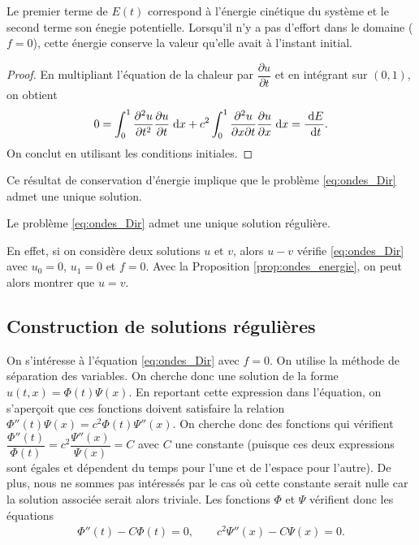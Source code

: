\documentclass[12pt,a4paper,twoside]{article}
\begin{document}
Le premier terme de $E(t)$ correspond \`a l'\'energie
cin\'etique du syst\`eme et le second terme son \'enegie potentielle.
Lorsqu'il n'y a pas d'effort dans le domaine ($f=0$),
cette \'energie conserve la valeur qu'elle avait \`a l'instant initial.

\begin{proof}
  En multipliant l'\'equation de la chaleur par $\dfrac{\partial u}{\partial t}$
  et en int\'egrant sur $(0,1)$, on obtient
  \begin{align*}
    0 = 
    \int_0^1 \dfrac{\partial^2 u}{\partial t^2} \dfrac{\partial u}{\partial t} \;\mathrm{d} x
    + c^2 
    \int_0^1 \dfrac{\partial^2 u}{\partial x \partial t} \dfrac{\partial u}{\partial x} \;\mathrm{d} x
    = \dfrac{\;\mathrm{d} E}{\;\mathrm{d} t} .
  \end{align*}
  On conclut en utilisant les conditions initiales.
\end{proof}

Ce r\'esultat de conservation d'\'energie implique que le probl\`eme 
\eqref{eq:ondes_Dir} admet une unique solution.
\begin{corrolary}
  Le probl\`eme \eqref{eq:ondes_Dir} admet une unique solution r\'eguli\`ere.
\end{corrolary}
En effet, si on consid\`ere deux solutions $u$ et $v$,
alors $u-v$ v\'erifie \eqref{eq:ondes_Dir} avec $u_0 = 0$, $u_1 = 0$ et $f=0$. 
Avec la Proposition \ref{prop:ondes_energie}, on peut alors
montrer que $u=v$.

\subsection{Construction de solutions r\'eguli\`eres}

On s'int\'eresse \`a l'\'equation \eqref{eq:ondes_Dir} avec $f = 0$.
On utilise la m\'ethode de s\'eparation des variables.
On cherche donc une solution de la forme $u(t,x) = \Phi(t) \Psi(x)$.
En reportant cette expression dans l'\'equation, on s'aper\c{c}oit 
que ces fonctions doivent satisfaire la relation
$\Phi''(t) \Psi(x) = c^2 \Phi(t) \Psi''(x)$.
On cherche donc des fonctions qui v\'erifient
$\dfrac{\Phi''(t)}{\Phi(t)} = c^2 \dfrac{\Psi''(x)}{\Psi(x)} = C$
avec $C$ une constante (puisque ces deux expressions sont \'egales 
et d\'ependent du temps pour l'une et de l'espace pour l'autre).
De plus, nous ne sommes pas int\'eress\'es par le cas o\`u cette
constante serait nulle car la solution associ\'ee serait alors triviale.
Les fonctions $\Phi$ et $\Psi$ v\'erifient donc les \'equations
\begin{align*}
  \Phi''(t) - C \Phi(t) = 0 , 
  \qquad
  c^2 \Psi''(x) - C \Psi(x) = 0 .
\end{align*}
\end{document}
